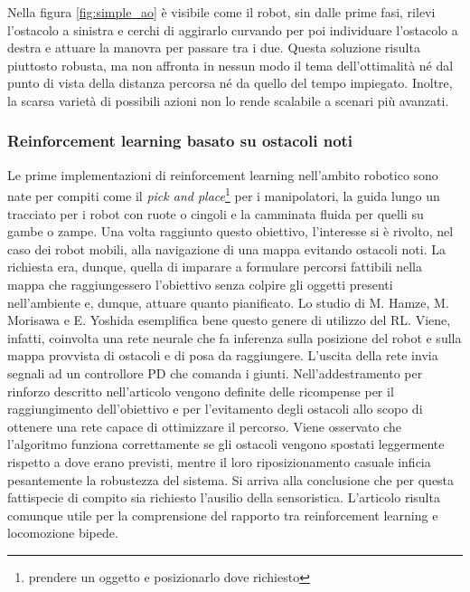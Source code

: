 Nella figura \ref{fig:simple_ao} è visibile come il robot, sin dalle prime fasi, rilevi l'ostacolo a sinistra e cerchi di aggirarlo curvando per poi individuare l'ostacolo a destra e attuare la manovra per passare tra i due. Questa soluzione risulta piuttosto robusta, ma non affronta in nessun modo il tema dell'ottimalità né dal punto di vista della distanza percorsa né da quello del tempo impiegato. Inoltre, la scarsa varietà di possibili azioni non lo rende scalabile a scenari più avanzati.


\subsubsection{Reinforcement learning basato su ostacoli noti}
Le prime implementazioni di reinforcement learning nell'ambito robotico sono nate per compiti come il \textit{pick and place}\footnote{prendere un oggetto e posizionarlo dove richiesto} per i manipolatori, la guida lungo un tracciato per i robot con ruote o cingoli e la camminata fluida per quelli su gambe o zampe. Una volta raggiunto questo obiettivo, l'interesse si è rivolto, nel caso dei robot mobili, alla navigazione di una mappa evitando ostacoli noti. La richiesta era, dunque, quella di imparare a formulare percorsi fattibili nella mappa che raggiungessero l'obiettivo senza colpire gli oggetti presenti nell'ambiente e, dunque, attuare quanto pianificato. Lo studio di M. Hamze, M. Morisawa e E. Yoshida \cite{hamze2024learning} esemplifica bene questo genere di utilizzo del RL. Viene, infatti, coinvolta una rete neurale che fa inferenza sulla posizione del robot e sulla mappa provvista di ostacoli e di posa da raggiungere. L'uscita della rete invia segnali ad un controllore PD che comanda i giunti. Nell'addestramento per rinforzo descritto nell'articolo vengono definite delle ricompense per il raggiungimento dell'obiettivo e per l'evitamento degli ostacoli allo scopo di ottenere una rete capace di ottimizzare il percorso. Viene osservato che l'algoritmo funziona correttamente se gli ostacoli vengono spostati leggermente rispetto a dove erano previsti, mentre il loro riposizionamento casuale inficia pesantemente la robustezza del sistema. Si arriva alla conclusione che per questa fattispecie di compito sia richiesto l'ausilio della sensoristica. L'articolo risulta comunque utile per la comprensione del rapporto tra reinforcement learning e locomozione bipede.


